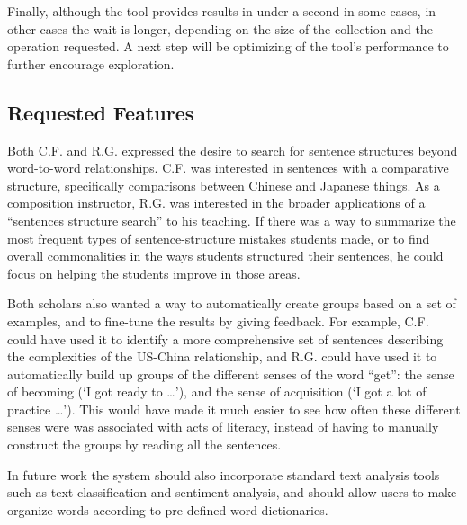 Finally, although the tool provides results in under a second in some cases, in other cases the wait is longer, depending on the size of the collection and the operation requested.  A next step will be optimizing of the tool's performance to further encourage exploration. 
 
 \subsection{Requested Features}
 Both C.F. and R.G. expressed the desire to search for sentence structures beyond word-to-word relationships. C.F. was interested in sentences with a comparative structure, specifically comparisons between  Chinese and Japanese things. As a composition instructor, R.G. was interested in the broader applications of a ``sentences structure search'' to his teaching.  If there was a way to summarize the most frequent types of sentence-structure mistakes students made, or to find overall commonalities in the ways students structured their sentences, he could focus on helping the students improve in those areas.
 
Both scholars also wanted a way to automatically create groups based on a set of examples, and to fine-tune the results by giving feedback. For example, C.F. could have used it to identify a more comprehensive set of sentences describing the complexities of the US-China relationship, and R.G. could have used it to automatically build up groups of the different senses of the word ``get'': the sense of becoming (`I got ready to \ldots'), and the sense of acquisition (`I got a lot of practice \ldots'). This would have made it much easier to see how often these different senses were was associated with acts of literacy, instead of having to manually construct the groups by reading all the sentences.
 
In future work the system should also incorporate standard text analysis tools such as text classification and sentiment analysis, and should allow users to make organize words according to pre-defined word dictionaries.
	
